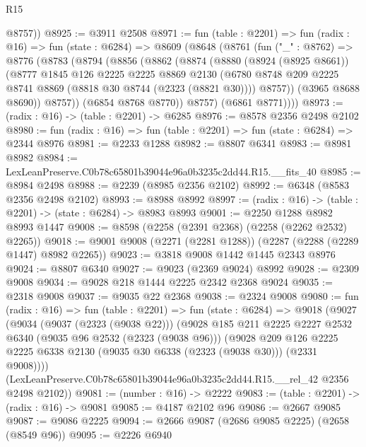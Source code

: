 \begin{lexlean}{R15}
\begin{coremodule}
        @8757))
@8925 := @3911 @2508
@8971 := fun (table : @2201) =>
  fun (radix : @16) =>
  fun (state : @6284) =>
  @8609
    (@8648
      (@8761
        (fun ("_" : @8762) =>
        @8776
          (@8783
            (@8794
              (@8856
                (@8862
                  (@8874
                    (@8880
                      (@8924 (@8925 @8661))
                      (@8777
                        @1845
                        @126
                        @2225
                        @2225
                        @8869
                        @2130
                        (@6780 @8748 @209 @2225 @8741 @8869 (@8818 @30 @8744 (@2323 (@8821 @30))))
                        @8757))
                    (@3965 @8688 @8690))
                  @8757))
              (@6854 @8768 @8770))
            @8757)
          (@6861 @8771))))
@8973 := (radix : @16) -> (table : @2201) -> @6285
@8976 := @8578 @2356 @2498 @2102
@8980 := fun (radix : @16) => fun (table : @2201) => fun (state : @6284) => @2344 @8976
@8981 := @2233 @1288
@8982 := @8807 @6341
@8983 := @8981 @8982
@8984 := LexLeanPreserve.C0b78c65801b39044e96a0b3235c2dd44.R15.__fits_40
@8985 := @8984 @2498
@8988 := @2239 (@8985 @2356 @2102)
@8992 := @6348 (@8583 @2356 @2498 @2102)
@8993 := @8988 @8992
@8997 := (radix : @16) -> (table : @2201) -> (state : @6284) -> @8983 @8993
@9001 := @2250 @1288 @8982 @8993 @1447
@9008 := @8598 (@2258 (@2391 @2368) (@2258 (@2262 @2532) @2265))
@9018 := @9001 @9008 (@2271 (@2281 @1288)) (@2287 (@2288 (@2289 @1447) @8982 @2265))
@9023 := @3818 @9008 @1442 @1445 @2343 @8976
@9024 := @8807 @6340
@9027 := @9023 (@2369 @9024) @8992
@9028 := @2309 @9008
@9034 := @9028 @218 @1444 @2225 @2342 @2368 @9024
@9035 := @2318 @9008
@9037 := @9035 @22 @2368
@9038 := @2324 @9008
@9080 := fun (radix : @16) =>
  fun (table : @2201) =>
  fun (state : @6284) =>
  @9018
    (@9027
      (@9034
        (@9037 (@2323 (@9038 @22)))
        (@9028
          @185
          @211
          @2225
          @2227
          @2532
          @6340
          (@9035 @96 @2532 (@2323 (@9038 @96)))
          (@9028
            @209
            @126
            @2225
            @2225
            @6338
            @2130
            (@9035 @30 @6338 (@2323 (@9038 @30)))
            (@2331 @9008))))
      (LexLeanPreserve.C0b78c65801b39044e96a0b3235c2dd44.R15.__rel_42 @2356 @2498 @2102))
@9081 := (number : @16) -> @2222
@9083 := (table : @2201) -> (radix : @16) -> @9081
@9085 := @4187 @2102 @96
@9086 := @2667 @9085
@9087 := @9086 @2225
@9094 := @2666 @9087 (@2686 @9085 @2225) (@2658 (@8549 @96))
@9095 := @2226 @6940

\end{coremodule}
\end{lexlean}
